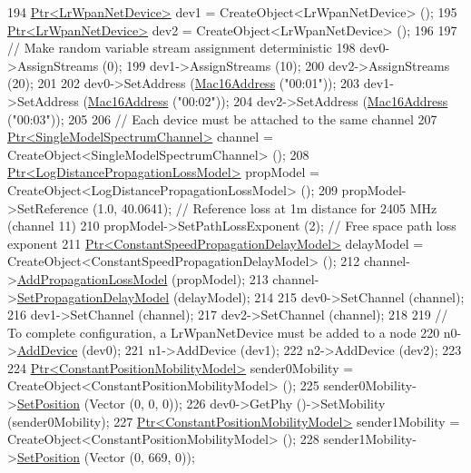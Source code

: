 \begin{DoxyCode}
194   \hyperlink{classns3_1_1Ptr}{Ptr<LrWpanNetDevice>} dev1 = CreateObject<LrWpanNetDevice> ();
195   \hyperlink{classns3_1_1Ptr}{Ptr<LrWpanNetDevice>} dev2 = CreateObject<LrWpanNetDevice> ();
196 
197   \textcolor{comment}{// Make random variable stream assignment deterministic}
198   dev0->AssignStreams (0);
199   dev1->AssignStreams (10);
200   dev2->AssignStreams (20);
201 
202   dev0->SetAddress (\hyperlink{classns3_1_1Mac16Address}{Mac16Address} (\textcolor{stringliteral}{"00:01"}));
203   dev1->SetAddress (\hyperlink{classns3_1_1Mac16Address}{Mac16Address} (\textcolor{stringliteral}{"00:02"}));
204   dev2->SetAddress (\hyperlink{classns3_1_1Mac16Address}{Mac16Address} (\textcolor{stringliteral}{"00:03"}));
205 
206   \textcolor{comment}{// Each device must be attached to the same channel}
207   \hyperlink{classns3_1_1Ptr}{Ptr<SingleModelSpectrumChannel>} channel = 
      CreateObject<SingleModelSpectrumChannel> ();
208   \hyperlink{classns3_1_1Ptr}{Ptr<LogDistancePropagationLossModel>} propModel = 
      CreateObject<LogDistancePropagationLossModel> ();
209   propModel->SetReference (1.0, 40.0641); \textcolor{comment}{// Reference loss at 1m distance for 2405 MHz (channel 11)}
210   propModel->SetPathLossExponent (2); \textcolor{comment}{// Free space path loss exponent}
211   \hyperlink{classns3_1_1Ptr}{Ptr<ConstantSpeedPropagationDelayModel>} delayModel = 
      CreateObject<ConstantSpeedPropagationDelayModel> ();
212   channel->\hyperlink{classns3_1_1SingleModelSpectrumChannel_a3d8c68e54e0e7659fdf715260d5613ac}{AddPropagationLossModel} (propModel);
213   channel->\hyperlink{classns3_1_1SingleModelSpectrumChannel_afd757c085623596ebf3da8264cfbaa45}{SetPropagationDelayModel} (delayModel);
214 
215   dev0->SetChannel (channel);
216   dev1->SetChannel (channel);
217   dev2->SetChannel (channel);
218 
219   \textcolor{comment}{// To complete configuration, a LrWpanNetDevice must be added to a node}
220   n0->\hyperlink{classns3_1_1Node_a42ff83ee1d5d1649c770d3f5b62375de}{AddDevice} (dev0);
221   n1->AddDevice (dev1);
222   n2->AddDevice (dev2);
223 
224   \hyperlink{classns3_1_1Ptr}{Ptr<ConstantPositionMobilityModel>} sender0Mobility = 
      CreateObject<ConstantPositionMobilityModel> ();
225   sender0Mobility->\hyperlink{classns3_1_1MobilityModel_ac584b3d5a309709d2f13ed6ada1e7640}{SetPosition} (Vector (0, 0, 0));
226   dev0->GetPhy ()->SetMobility (sender0Mobility);
227   \hyperlink{classns3_1_1Ptr}{Ptr<ConstantPositionMobilityModel>} sender1Mobility = 
      CreateObject<ConstantPositionMobilityModel> ();
228   sender1Mobility->\hyperlink{classns3_1_1MobilityModel_ac584b3d5a309709d2f13ed6ada1e7640}{SetPosition} (Vector (0, 669, 0));

\end{DoxyCode}
